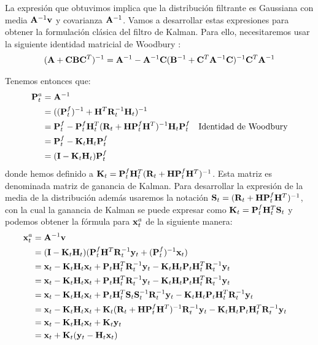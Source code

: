 La expresión que obtuvimos implica que la distribución filtrante es Gaussiana con media $\mathbf{A}^{-1}\mathbf{v}$ y covarianza $\mathbf{A}^{-1}$. Vamos a desarrollar estas expresiones para obtener la formulación clásica del filtro de Kalman. Para ello, necesitaremos usar la siguiente identidad matricial de Woodbury \citep{Golub1996}:
\begin{align*}
    (\mathbf{A} + \mathbf{C} \mathbf{B} \mathbf{C}^T)^{-1} = \mathbf{A}^{-1} - \mathbf{A}^{-1} \mathbf{C} (\mathbf{B}^{-1} + \mathbf{C}^T \mathbf{A}^{-1} \mathbf{C})^{-1} \mathbf{C}^T \mathbf{A}^{-1}
\end{align*}

Tenemos entonces que:
\begin{align*}
    \mathbf{P}_t^a &= \mathbf{A}^{-1} && \\
    &= ((\mathbf{P}_t^f)^{-1} + \mathbf{H}^T \mathbf{R}_t^{-1} \mathbf{H}_t)^{-1} && \\
    &= \mathbf{P}_t^f - \mathbf{P}_t^f \mathbf{H}_t^T (\mathbf{R}_t + \mathbf{H} \mathbf{P}_t^f \mathbf{H}^T)^{-1} \mathbf{H}_t \mathbf{P}_t^f && \text{Identidad de Woodbury}\\
    &= \mathbf{P}_t^f - \mathbf{K}_t \mathbf{H}_t \mathbf{P}_t^f && \\
    &= (\mathbf{I} - \mathbf{K}_t \mathbf{H}_t) \mathbf{P}_t^f && \\
\end{align*}
donde hemos definido a $\mathbf{K}_t = \mathbf{P}_t^f \mathbf{H}_t^T (\mathbf{R}_t + \mathbf{H} \mathbf{P}_t^f \mathbf{H}^T)^{-1}$. Esta matriz es denominada matriz de ganancia de Kalman. Para desarrollar la expresión de la media de la distribución además usaremos la notación $\mathbf{S}_t = (\mathbf{R}_t + \mathbf{H} \mathbf{P}_t^f \mathbf{H}^T)^{-1}$, con la cual la ganancia de Kalman se puede expresar como $\mathbf{K}_t = \mathbf{P}_t^f \mathbf{H}_t^T \mathbf{S}_t$ y podemos obtener la fórmula para $\mathbf{x}_t^a$ de la siguiente manera:
\begin{align*}
    \mathbf{x}_t^a &= \mathbf{A}^{-1} \mathbf{v} && \\
    &= (\mathbf{I} - \mathbf{K}_t \mathbf{H}_t) (\mathbf{P}_t^f \mathbf{H}^T \mathbf{R}_t^{-1} \mathbf{y}_t + (\mathbf{P}_t^{f})^{-1} \mathbf{x}_t) && \\
    &= \mathbf{x}_t - \mathbf{K}_t \mathbf{H}_t \mathbf{x}_t + \mathbf{P}_t \mathbf{H}_t^T \mathbf{R}_t^{-1} \mathbf{y}_t - \mathbf{K}_t \mathbf{H}_t \mathbf{P}_t \mathbf{H}_t^T \mathbf{R}_t^{-1} \mathbf{y}_t && \\
    &= \mathbf{x}_t - \mathbf{K}_t \mathbf{H}_t \mathbf{x}_t + \mathbf{P}_t \mathbf{H}_t^T \mathbf{R}_t^{-1} \mathbf{y}_t - \mathbf{K}_t \mathbf{H}_t \mathbf{P}_t \mathbf{H}_t^T \mathbf{R}_t^{-1} \mathbf{y}_t && \\
    &= \mathbf{x}_t - \mathbf{K}_t \mathbf{H}_t \mathbf{x}_t + \mathbf{P}_t \mathbf{H}_t^T \mathbf{S}_t \mathbf{S}_t^{-1} \mathbf{R}_t^{-1} \mathbf{y}_t - \mathbf{K}_t \mathbf{H}_t \mathbf{P}_t \mathbf{H}_t^T \mathbf{R}_t^{-1} \mathbf{y}_t && \\
    &= \mathbf{x}_t - \mathbf{K}_t \mathbf{H}_t \mathbf{x}_t + \mathbf{K}_t (\mathbf{R}_t + \mathbf{H} \mathbf{P}_t^f \mathbf{H}^T)^{-1} \mathbf{R}_t^{-1} \mathbf{y}_t - \mathbf{K}_t \mathbf{H}_t \mathbf{P}_t \mathbf{H}_t^T \mathbf{R}_t^{-1} \mathbf{y}_t && \\
    &= \mathbf{x}_t - \mathbf{K}_t \mathbf{H}_t \mathbf{x}_t + \mathbf{K}_t \mathbf{y}_t && \\
    &= \mathbf{x}_t + \mathbf{K}_t (\mathbf{y}_t - \mathbf{H}_t \mathbf{x}_t) && \\
\end{align*}

